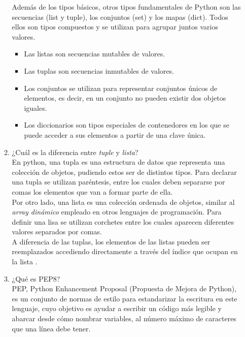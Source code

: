 \documentclass[a4paper,openright,12pt]{report}
\begin{document}
\begin{itemize}
\begin{enumerate}
			Además de los tipos básicos, otros tipos fundamentales de Python son las secuencias (list y tuple), los conjuntos (set) y los mapas (dict). Todos ellos son tipos compuestos y se utilizan para agrupar juntos varios valores.\\
			
			\begin{itemize}
			\item Las listas son secuencias mutables de valores.
			\item Las tuplas son secuencias inmutables de valores.
			\item Los conjuntos se utilizan para representar conjuntos únicos de elementos, es decir, en un conjunto no pueden existir dos objetos iguales.
			\item Los diccionarios son tipos especiales de contenedores en los que se puede acceder a sus elementos a partir de una clave única.
			\end{itemize}
			
			\item ¿Cuál es la diferencia entre \textit{tuple} y \textit{lista}? \\
			
			En python, una tupla es una estructura de datos que representa una colección de objetos, pudiendo estos ser de distintos tipos. Para declarar una tupla se utilizan paréntesis, entre los cuales deben separarse por comas los elementos que van a formar parte de ella.\\
			
			Por otro lado, una lista es una colección ordenada de objetos, similar al \textit{array dinámico} empleado en otros lenguajes de programación. Para definir una lisa se utilizan corchetes entre los cuales aparecen diferentes valores separados por comas.\\
			
			A diferencia de las tuplas, los elementos de las listas pueden ser reemplazados accediendo directamente a través del índice que ocupan en la lista \cite{montoro2012python}.\\
			
			
			\item ¿Qué es PEP8? \\
			
			PEP, Python Enhancement Proposal (Propuesta de Mejora de Python), es un conjunto de normas de estilo para estandarizar la escritura en este lenguaje, cuyo objetivo es ayudar a escribir un código más legible y abarcar desde cómo nombrar variables, al número máximo de caracteres que una línea debe tener.\\
			

\end{enumerate}
\end{itemize}
\end{document}
